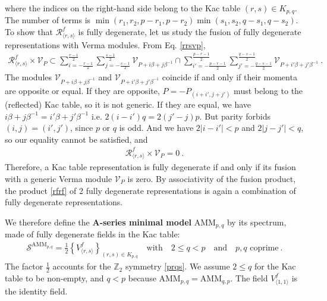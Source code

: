 \documentclass[12pt, a4paper]{article}
\newcommand{\myindex}[1]{\textbf{\boldmath #1}}
\begin{document}
where the indices on the right-hand side belong to the Kac table $(r,s)\in K_{p,q}$. The number of terms is $\min(r_1,r_2,p-r_1,p-r_2)\min(s_1,s_2,q-s_1,q-s_2)$. To show that $\mathcal{R}^f_{\langle r,s\rangle}$ is fully degenerate, let us study the fusion of fully degenerate representations with Verma modules.
From Eq. \eqref{rrsvp},
\begin{align}
 \mathcal{R}^f_{\langle r,s\rangle}\times \mathcal{V}_P \subset \sum_{i=-\frac{r-1}{2}}^{\frac{r-1}{2}} \sum_{j=-\frac{s-1}{2}}^{\frac{s-1}{2}} \mathcal{V}_{P+i\beta +j\beta^{-1}} \cap \sum_{i'=-\frac{p-r-1}{2}}^{\frac{p-r-1}{2}} \sum_{j'=-\frac{q-s-1}{2}}^{\frac{q-s-1}{2}} \mathcal{V}_{P+i'\beta +j'\beta^{-1}}\ .
\end{align}
The modules $\mathcal{V}_{P+i\beta +j\beta^{-1}}$ and $\mathcal{V}_{P+i'\beta +j'\beta^{-1}}$ coincide if and only if their momenta are opposite or equal. If they are opposite, $P=-P_{(i+i',j+j')}$ must belong to the (reflected) Kac table, so it is not generic. If they are equal, we have $i\beta +j\beta^{-1} = i'\beta +j'\beta^{-1}$ i.e. $2(i-i')q = 2(j'-j)p$.
But parity forbids $(i,j)=(i',j')$, since $p$ or $q$ is odd. And we have $2|i-i'|<p$ and $2|j-j'|<q$, so our equality cannot be satisfied, and 
\begin{align}
 \mathcal{R}^f_{\langle r,s\rangle}\times \mathcal{V}_P = 0 \ . 
\end{align}
Therefore, a Kac table representation is fully degenerate if and only if its fusion with a generic Verma module $\mathcal{V}_P$ is zero.
By associativity of the fusion product, the product \eqref{rfrf} of 2 fully degenerate representations is again a combination of fully degenerate representations.

We therefore define the \myindex{A-series minimal model} AMM$_{p,q}$ by its spectrum, made of fully degenerate fields in the Kac table:
\begin{align}
 \boxed{\mathcal{S}^{\text{AMM}_{p,q}} = \frac12\left\{ V^f_{\langle r,s\rangle} \right\}_{(r,s)\in K_{p,q}} \quad \text{with} \quad 2\leq q<p \quad \text{and} \quad p, q \text{ coprime}}\ .
 \label{samm}
\end{align}
The factor $\frac12$ accounts for the $\mathbb{Z}_2$ symmetry \eqref{prqs}. We assume $2\leq q$ for the Kac table to be non-empty, and $q<p$ because AMM$_{p, q}=$AMM$_{q,p}$. The field $V^f_{\langle 1,1\rangle}$ is the identity field.
\end{document}
